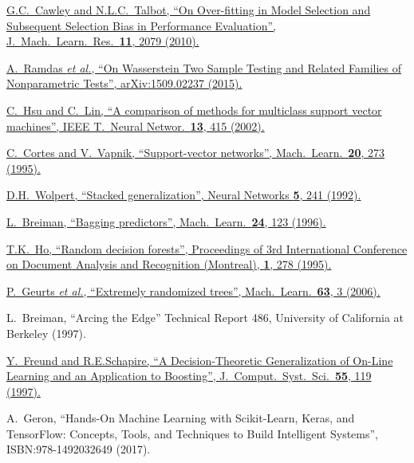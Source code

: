 {\begin{thebibliography}{xxx}
	\href{http://www.jmlr.org/papers/volume11/cawley10a/cawley10a.pdf}{G.C.~Cawley and N.L.C.~Talbot, \enquote{On Over-fitting in Model Selection and Subsequent Selection Bias in Performance Evaluation}, J.\ Mach.\ Learn.\ Res.\ \textbf{11}, 2079 (2010).}

	\href{https://arxiv.org/abs/1509.02237v2}{A.~Ramdas \textit{et al.}, \enquote{On Wasserstein Two Sample Testing and Related Families of Nonparametric Tests}, arXiv:1509.02237 (2015).}

	\href{https://doi.org/10.1109/72.991427}{C.~Hsu and C.~Lin, \enquote{A comparison of methods for multiclass support vector machines}, IEEE T.\ Neural Networ.\ \textbf{13}, 415 (2002).}

	\href{https://doi.org/10.1007/BF00994018}{C.~Cortes and V.~Vapnik, \enquote{Support-vector networks}, Mach.\ Learn.\ \textbf{20}, 273 (1995).}

	\href{https://doi.org/10.1016/S0893-6080(05)80023-1}{D.H.~Wolpert, \enquote{Stacked generalization}, Neural Networks \textbf{5}, 241 (1992).}

	\href{https://doi.org/10.1023/A:1018054314350}{L.~Breiman, \enquote{Bagging predictors}, Mach.\ Learn.\ \textbf{24}, 123 (1996).}

	\href{https://doi.org/10.1109/ICDAR.1995.598994}{T.K.~Ho, \enquote{Random decision forests}, Proceedings of 3rd International Conference on Document Analysis and Recognition (Montreal), \textbf{1}, 278 (1995).}

	\href{https://doi.org/10.1007/s10994-006-6226-1}{P.~Geurts \textit{et al.}, \enquote{Extremely randomized trees}, Mach.\ Learn.\ \textbf{63}, 3 (2006).}

	L.~Breiman, \enquote{Arcing the Edge} Technical Report 486, University of California at Berkeley (1997).

	\href{https://doi.org/10.1006/jcss.1997.1504}{Y.~Freund and R.E.Schapire, \enquote{A Decision-Theoretic Generalization of On-Line Learning and an Application to Boosting}, J.\ Comput.\ Syst.\ Sci.\ \textbf{55}, 119 (1997).}

	A.~Geron, \enquote{Hands-On Machine Learning with Scikit-Learn, Keras, and TensorFlow: Concepts, Tools, and Techniques to Build Intelligent Systems}, ISBN:978-1492032649 (2017).


\end{thebibliography}}
